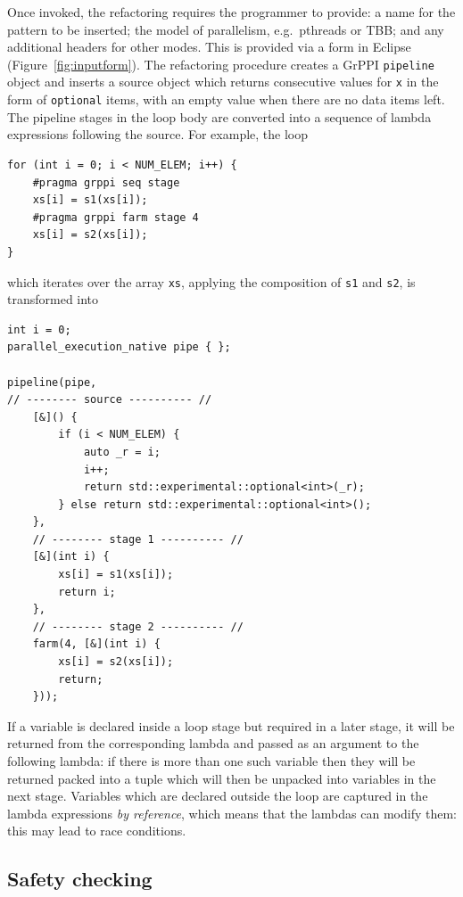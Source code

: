 Once invoked, the refactoring requires the programmer to provide: a name for the pattern to be inserted; the model of parallelism, e.g.\ pthreads or TBB; and any additional headers for other modes. This is provided via a form in Eclipse (Figure~\ref{fig:inputform}).
% 
The refactoring procedure creates a GrPPI \lstinline|pipeline| object and
inserts a source object which returns consecutive values for \texttt{x}
in the form of \texttt{optional} items, with an empty value when there
are no data items left.
% 
The pipeline stages in the loop body are converted into a sequence of
lambda expressions following the source.
% 
For example, the loop
% 
\begin{lstlisting}
for (int i = 0; i < NUM_ELEM; i++) {
    #pragma grppi seq stage
    xs[i] = s1(xs[i]);
    #pragma grppi farm stage 4
    xs[i] = s2(xs[i]);
}
\end{lstlisting}
% 
\noindent
which iterates over the array \texttt{xs}, applying the composition of \texttt{s1} and \texttt{s2}, is transformed into
% 
\begin{lstlisting}
int i = 0;
parallel_execution_native pipe { };

pipeline(pipe,
// -------- source ---------- //
    [&]() {
    	if (i < NUM_ELEM) {
    		auto _r = i;
    		i++;
    		return std::experimental::optional<int>(_r);
    	} else return std::experimental::optional<int>();
    },
    // -------- stage 1 ---------- //
    [&](int i) {
    	xs[i] = s1(xs[i]);
    	return i;
    },
    // -------- stage 2 ---------- //
    farm(4, [&](int i) {
    	xs[i] = s2(xs[i]);
    	return;
    }));
\end{lstlisting}
%
If a variable is declared
inside a loop stage but required in a later stage, it will be returned
from the corresponding lambda and passed as an argument to the following
lambda: if there is more than one such variable then they will be
returned packed into a tuple which will then be unpacked into variables
in the next stage.
%
Variables which are declared outside the loop are captured in the lambda
expressions \emph{by reference}, which means that the lambdas can modify
them: this may lead to race conditions.

\subsection{Safety checking}\label{safety-checking}

